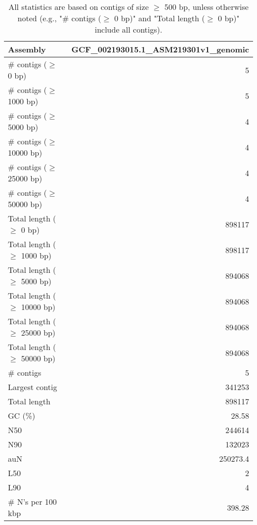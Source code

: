 \documentclass[12pt,a4paper]{article}
\begin{document}
\begin{table}[ht]
\begin{center}
\caption{All statistics are based on contigs of size $\geq$ 500 bp, unless otherwise noted (e.g., "\# contigs ($\geq$ 0 bp)" and "Total length ($\geq$ 0 bp)" include all contigs).}
\begin{tabular}{|l*{1}{|r}|}
\hline
Assembly & GCF\_002193015.1\_ASM219301v1\_genomic \\ \hline
\# contigs ($\geq$ 0 bp) & 5 \\ \hline
\# contigs ($\geq$ 1000 bp) & 5 \\ \hline
\# contigs ($\geq$ 5000 bp) & 4 \\ \hline
\# contigs ($\geq$ 10000 bp) & 4 \\ \hline
\# contigs ($\geq$ 25000 bp) & 4 \\ \hline
\# contigs ($\geq$ 50000 bp) & 4 \\ \hline
Total length ($\geq$ 0 bp) & 898117 \\ \hline
Total length ($\geq$ 1000 bp) & 898117 \\ \hline
Total length ($\geq$ 5000 bp) & 894068 \\ \hline
Total length ($\geq$ 10000 bp) & 894068 \\ \hline
Total length ($\geq$ 25000 bp) & 894068 \\ \hline
Total length ($\geq$ 50000 bp) & 894068 \\ \hline
\# contigs & 5 \\ \hline
Largest contig & 341253 \\ \hline
Total length & 898117 \\ \hline
GC (\%) & 28.58 \\ \hline
N50 & 244614 \\ \hline
N90 & 132023 \\ \hline
auN & 250273.4 \\ \hline
L50 & 2 \\ \hline
L90 & 4 \\ \hline
\# N's per 100 kbp & 398.28 \\ \hline
\end{tabular}
\end{center}
\end{table}
\end{document}
